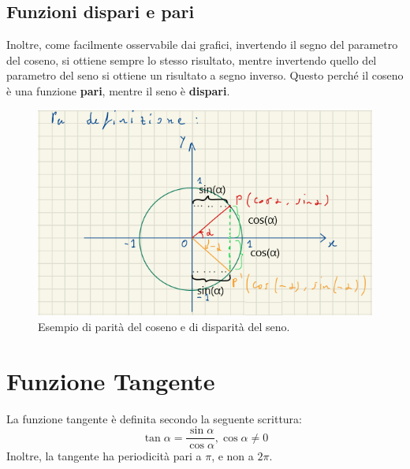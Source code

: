 \documentclass[12pt]{article}
\begin{document}
\subsection{Funzioni dispari e pari}
Inoltre, come facilmente osservabile dai grafici, invertendo il segno del parametro del coseno, si ottiene sempre lo stesso risultato, mentre invertendo quello del parametro del seno si ottiene un risultato a segno inverso.
Questo perché il coseno è una funzione \textbf{pari}, mentre il seno è \textbf{dispari}.
\begin{figure}[!htb]
    \centering
    \includegraphics[width=1\textwidth, height=.7\textheight,keepaspectratio]{lezione_6/sin_cos_dispari_pari.PNG}
    \begin{center}
        \caption{\label{fig:sin_cos_dispari_pari}Esempio di parità del coseno e di disparità del seno.}
    \end{center}
\end{figure}
\section{Funzione Tangente}
La funzione tangente è definita secondo la seguente scrittura:
\begin{equation}
    \tan{\alpha} = \dfrac{\sin{\alpha}}{\cos{\alpha}}, \cos{\alpha} \not= 0 \label{eq:funzione_tangente}
\end{equation}
Inoltre, la tangente ha periodicità pari a $\pi$, e non a $2\pi$.
\end{document}
